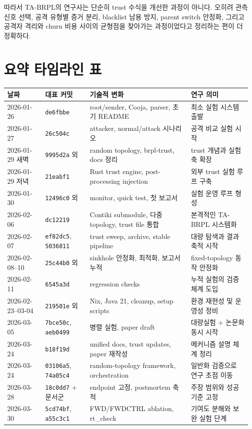 \documentclass[12pt,a4paper]{article}
\begin{document}
따라서 TA-BRPL의 연구사는 단순히 trust 수식을 개선한 과정이 아니다.
오히려 관측 신호 선택, 공격 유형별 증거 분리, blacklist 남용 방지, parent switch
안정화, 그리고 공격자 격리와 churn 비용 사이의 균형점을 찾아가는 과정이었다고
정리하는 편이 더 정확하다.

\section{요약 타임라인 표}

\begin{longtable}{p{2.2cm}p{2.3cm}p{4.0cm}p{5.5cm}}
\toprule
날짜 & 대표 커밋 & 기술적 변화 & 연구 의미 \\
\midrule
\endhead
2026-01-26 & \texttt{de6fbbe} & root/sender, Cooja, parser, 초기 README & 최소 실험 시스템 출발 \\
2026-01-27 & \texttt{26c504c} & attacker, normal/attack 시나리오 & 공격 비교 실험 시작 \\
2026-01-29 새벽 & \texttt{9995d2a} 외 & random topology, brpl-trust, docs 정리 & trust 개념과 실험 축 확장 \\
2026-01-29 저녁 & \texttt{21eabf1} & Rust trust engine, post-processing injection & 외부 trust 실험 루프 구축 \\
2026-01-30 & \texttt{12496c0} 외 & monitor, quick test, 첫 보고서 & 실험 운영 루프 형성 \\
2026-02-06 & \texttt{dc12219} & Contiki submodule, 다중 topology, trust file 통합 & 본격적인 TA-BRPL 시스템화 \\
2026-02-07 & \texttt{ef82dc5}, \texttt{5036811} & trust sweep, archive, stable pipeline & 대량 탐색과 결과 축적 시작 \\
2026-02-08--10 & \texttt{25c44b0} 외 & sinkhole 안정화, 최적화, 보고서 누적 & fixed-topology 동작 안정화 \\
2026-02-11 & \texttt{6545a3d} & regression checks & 누적 실험의 검증 체계 도입 \\
2026-02-23--03-04 & \texttt{219501e} 외 & Nix, Java 21, cleanup, setup scripts & 환경 재현성 및 운영성 정비 \\
2026-03-05 & \texttt{7bce50c}, \texttt{aeb0499} & 병렬 실험, paper draft & 대량실험 + 논문화 동시 시작 \\
2026-03-24 & \texttt{b18f19d} & unified docs, trust updates, paper 재작성 & 메커니즘 설명 체계 정리 \\
2026-03-24 & \texttt{03106a5}, \texttt{74a05c4} & random-topology framework, orchestration & 일반화 검증으로 연구 초점 이동 \\
2026-03-28 & \texttt{18c0dd7} + 문서군 & endpoint 고정, postmortem 축적 & 주장 범위와 성공 기준 고정 \\
2026-03-30 & \texttt{5cd74bf}, \texttt{a55c3c1} & FWD/FWDCTRL ablation, rt\_check & 기여도 분해와 보완 실험 단계 \\
\bottomrule
\end{longtable}
\end{document}
